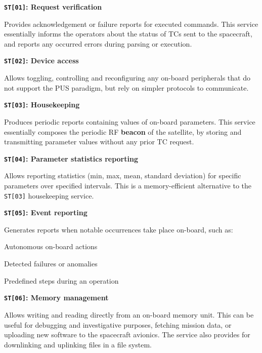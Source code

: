 \documentclass[a4paper,nobib,final]{tufte-book}
\begin{document}
\begin{compactitem}
	\item \textbf{\texttt{ST[01]}: Request verification}
	
	Provides acknowledgement or failure reports for executed commands. This service essentially informs the operators about the status of \acp{TC} sent to the spacecraft, and reports any occurred errors during parsing or execution.
	
	\item \textbf{\texttt{ST[02]}: Device access}
	
	Allows toggling, controlling and reconfiguring any on-board peripherals that do not support the \ac{PUS} paradigm, but rely on simpler protocols to communicate.
	
	\item \textbf{\texttt{ST[03]}: Housekeeping}
	
	Produces periodic reports containing values of on-board parameters. This service essentially composes the periodic \acs{RF} \textbf{beacon} of the satellite, by storing and transmitting parameter values without any prior \acs{TC} request.
	
	\item \textbf{\texttt{ST[04]}: Parameter statistics reporting}
	
	Allows reporting statistics (min, max, mean, standard deviation) for specific parameters over specified intervals. This is a memory-efficient alternative to the \texttt{ST[03]} housekeeping service.
	
	\item \textbf{\texttt{ST[05]}: Event reporting}
	
	Generates reports when notable occurrences take place on-board, such as:
	\begin{compactitem}
		\item Autonomous on-board actions
		\item Detected failures or anomalies
		\item Predefined steps during an operation
	\end{compactitem}
	
	\item \textbf{\texttt{ST[06]}: Memory management}
	
	Allows writing and reading directly from an on-board memory unit. This can be useful for debugging and investigative purposes, fetching mission data, or uploading new software to the spacecraft avionics. The service also provides for downlinking and uplinking files in a file system.
	

\end{compactitem}
\end{document}
